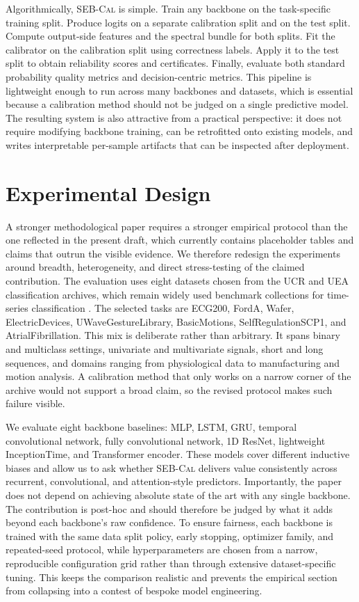 \documentclass{article}
\newcommand{\method}{\textsc{SEB-Cal}}
\begin{document}
Algorithmically, \method{} is simple. Train any backbone on the task-specific training split. Produce logits on a separate calibration split and on the test split. Compute output-side features and the spectral bundle for both splits. Fit the calibrator on the calibration split using correctness labels. Apply it to the test split to obtain reliability scores and certificates. Finally, evaluate both standard probability quality metrics and decision-centric metrics. This pipeline is lightweight enough to run across many backbones and datasets, which is essential because a calibration method should not be judged on a single predictive model. The resulting system is also attractive from a practical perspective: it does not require modifying backbone training, can be retrofitted onto existing models, and writes interpretable per-sample artifacts that can be inspected after deployment.

\section{Experimental Design}
A stronger methodological paper requires a stronger empirical protocol than the one reflected in the present draft, which currently contains placeholder tables and claims that outrun the visible evidence. We therefore redesign the experiments around breadth, heterogeneity, and direct stress-testing of the claimed contribution. The evaluation uses eight datasets chosen from the UCR and UEA classification archives, which remain widely used benchmark collections for time-series classification \cite{dau2019ucr,bagnall2018uea}. The selected tasks are ECG200, FordA, Wafer, ElectricDevices, UWaveGestureLibrary, BasicMotions, SelfRegulationSCP1, and AtrialFibrillation. This mix is deliberate rather than arbitrary. It spans binary and multiclass settings, univariate and multivariate signals, short and long sequences, and domains ranging from physiological data to manufacturing and motion analysis. A calibration method that only works on a narrow corner of the archive would not support a broad claim, so the revised protocol makes such failure visible.

We evaluate eight backbone baselines: MLP, LSTM, GRU, temporal convolutional network, fully convolutional network, 1D ResNet, lightweight InceptionTime, and Transformer encoder. These models cover different inductive biases and allow us to ask whether \method{} delivers value consistently across recurrent, convolutional, and attention-style predictors. Importantly, the paper does not depend on achieving absolute state of the art with any single backbone. The contribution is post-hoc and should therefore be judged by what it adds beyond each backbone's raw confidence. To ensure fairness, each backbone is trained with the same data split policy, early stopping, optimizer family, and repeated-seed protocol, while hyperparameters are chosen from a narrow, reproducible configuration grid rather than through extensive dataset-specific tuning. This keeps the comparison realistic and prevents the empirical section from collapsing into a contest of bespoke model engineering.
\end{document}
